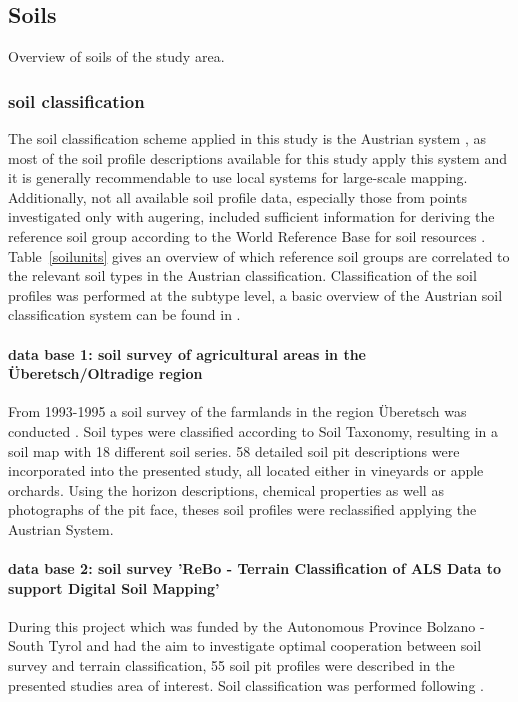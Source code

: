 \documentclass[preprint,12pt,authoryear]{elsarticle}
\begin{document}
\subsection{Soils}
Overview of soils of the study area.
\subsubsection{soil classification}
The soil classification scheme applied in this study is the Austrian system \citep{Nestroy2011}, as most of the soil profile descriptions available for this study apply this system and it is generally recommendable  to use local systems for large-scale mapping. Additionally, not all available soil profile data, especially those from points investigated only with augering, included sufficient information for deriving the reference soil group according to the World Reference Base for soil resources \citep{wrb}. Table~\ref{soilunits} gives an overview of which reference soil groups are correlated to the relevant soil types in the Austrian classification. Classification of the soil profiles was performed at the subtype level, a basic overview of the Austrian soil classification system can be found in \cite{Baruck2016}.

\paragraph{data base 1: soil survey of agricultural areas in the \"{U}beretsch/Oltradige region}
From 1993-1995 a soil survey of the farmlands in the region \"{U}beretsch was conducted \citep{Thalheimer2006}. Soil types were classified according to Soil Taxonomy, resulting in a soil map with 18 different soil series. 58 detailed soil pit descriptions were incorporated into the presented study, all located either in vineyards or apple orchards. Using the horizon descriptions, chemical properties as well as photographs of the pit face, theses soil profiles were reclassified applying the Austrian System.

\paragraph{data base 2: soil survey 'ReBo - Terrain Classification
of ALS Data to support Digital Soil Mapping'} 
During this project which was  funded by the Autonomous
Province Bolzano - South Tyrol and had the aim to investigate optimal cooperation between soil survey and terrain classification, 55 soil pit profiles were described in the presented studies area of interest. Soil classification was performed following \cite{kilian2015}.
\end{document}
